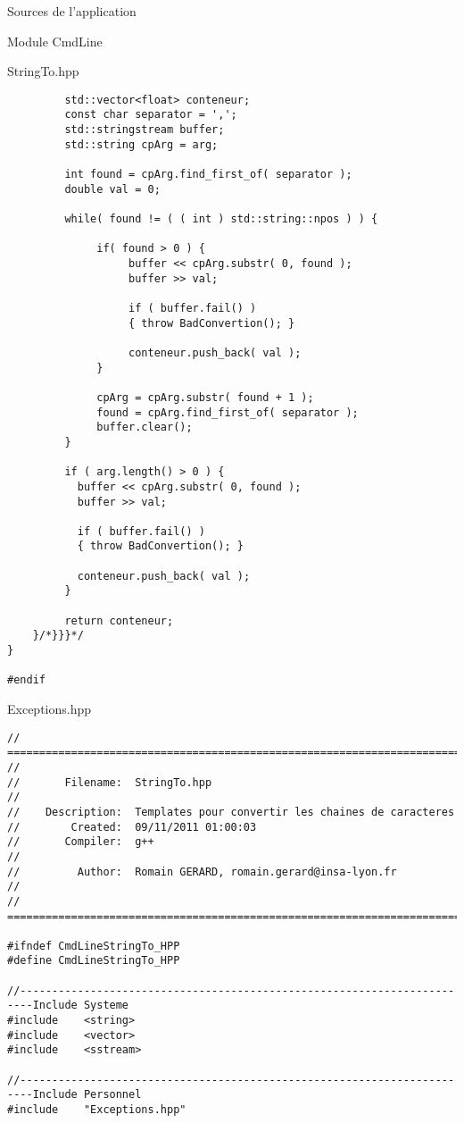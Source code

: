 \documentclass{article}
\begin{document}
\begin{section}{Sources de l'application}
\begin{subsection}{Module CmdLine}
\begin{paragraph}{StringTo.hpp}
\begin{verbatim}
         std::vector<float> conteneur;
         const char separator = ',';
         std::stringstream buffer;
         std::string cpArg = arg;

         int found = cpArg.find_first_of( separator );
         double val = 0;

         while( found != ( ( int ) std::string::npos ) ) {

              if( found > 0 ) {
                   buffer << cpArg.substr( 0, found );
                   buffer >> val;
                   
                   if ( buffer.fail() )
                   { throw BadConvertion(); }

                   conteneur.push_back( val );
              }

              cpArg = cpArg.substr( found + 1 );
              found = cpArg.find_first_of( separator );
              buffer.clear();
         }

         if ( arg.length() > 0 ) {
           buffer << cpArg.substr( 0, found );
           buffer >> val;

           if ( buffer.fail() )
           { throw BadConvertion(); }
           
           conteneur.push_back( val );
         }

         return conteneur;
    }/*}}}*/
}

#endif
  \end{verbatim}
  \end{paragraph}


  \newpage
  \begin{paragraph}{Exceptions.hpp}
   \begin{verbatim}
// =====================================================================================
// 
//       Filename:  StringTo.hpp
// 
//    Description:  Templates pour convertir les chaines de caracteres
//        Created:  09/11/2011 01:00:03
//       Compiler:  g++
// 
//         Author:  Romain GERARD, romain.gerard@insa-lyon.fr
// 
// =====================================================================================

#ifndef CmdLineStringTo_HPP
#define CmdLineStringTo_HPP

//------------------------------------------------------------------------Include Systeme
#include	<string>
#include	<vector>
#include	<sstream>

//------------------------------------------------------------------------Include Personnel
#include	"Exceptions.hpp"



\end{verbatim}
\end{paragraph}
\end{subsection}
\end{section}
\end{document}
